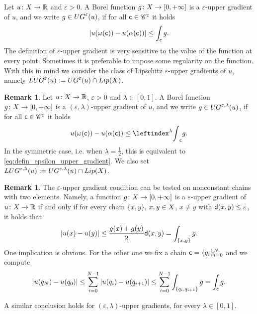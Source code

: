 \documentclass[12pt]{amsart}
\newcommand{\R}{\mathbb{R}}
\newcommand{\sfd}{{\sf d}}
\newcommand{\X}{{\rm X}}
\newcommand{\Lip}{{\rm Lip}}
\theoremstyle{definition}
\newtheorem{remark}[theorem]{Remark}
\newcommand{\sfc}{{\sf c}}
\newcommand{\Chain}[1]{\mathscr{C}^{#1}}
\newcommand{\UG}[1]{{\rm UG}^{#1}}
\newcommand{\LUG}[1]{{\rm LUG}^{#1}}
\begin{document}
Let $u\colon \X \to \R$ and $\varepsilon > 0$. A Borel function $g \colon \X \to [0,+\infty]$ is a $\varepsilon$-upper gradient of $u$, and we write $g\in \UG{\varepsilon}(u)$, if for all $\sfc \in \Chain{\varepsilon}$ it holds
\begin{equation}
    \label{eq:defin_epsilon_upper_gradient}
    |u(\omega(\sfc)) - u(\alpha(\sfc))| \le \int_\mathsf{c} g.
\end{equation}
%
The definition of $\varepsilon$-upper gradient is very sensitive to the value of the function at every point. Sometimes it is preferable to impose some regularity on the function. With this in mind we consider the class of Lipschitz $\varepsilon$-upper gradients of $u$, namely $\LUG{\varepsilon}(u) := \UG{\varepsilon}(u) \cap \Lip(\X)$.
%
\begin{remark}
    \label{rmk:lambda_upper_gradient}
    Let $u\colon \X \to \R$, $\varepsilon > 0$ and $\lambda \in [0,1]$. A Borel function $g \colon \X \to [0,+\infty]$ is a $(\varepsilon, \lambda)$-upper gradient of $u$, and we write $g\in \UG{\varepsilon,\lambda}(u)$, if for all $\sfc \in \Chain{\varepsilon}$ it holds
\begin{equation}
\label{eq:defin_epsilon_upper_gradient_lambda}
   u(\omega(\sfc)) - u(\alpha(\sfc)) \le \leftindex^\lambda{\int}_\mathsf{c} g.
\end{equation}
In the symmetric case, i.e. when $\lambda = \frac12$, this is equivalent to \eqref{eq:defin_epsilon_upper_gradient}. We also set $\LUG{\varepsilon,\lambda}(u) := \UG{\varepsilon,\lambda}(u) \cap \Lip(\X)$.
\end{remark}
%
\begin{remark}
\label{rem:integral_along_chains_of_length_2}
    The $\varepsilon$-upper gradient condition can be tested on nonconstant chains with two elements. Namely, a function $g\colon \X \to [0,+\infty]$ is a $\varepsilon$-upper gradient of $u\colon \X \to \R$ if and only if for every chain $\{x,y\}$, $x,y\in \X$, $x\neq y$ with $\sfd(x,y) \le \varepsilon$, it holds that
    $$\vert u(x) - u(y) \vert \le \frac{g(x)+g(y)}{2}\sfd(x,y) = \int_{\{x,y\}}g.$$
    One implication is obvious. For the other one we fix a chain $\sfc = \{q_i\}_{i=0}^N$ and we compute
    $$\vert u(q_N) - u(q_0) \vert \le \sum_{i=0}^{N-1} \vert u(q_i) - u(q_{i+1}) \vert \le \sum_{i=0}^{N-1} \int_{\{q_i,q_{i+1}\}} g = \int_\sfc g.$$

    A similar conclusion holds for $(\varepsilon,\lambda)$-upper gradients, for every $\lambda \in [0,1]$.
\end{remark}
\end{document}
